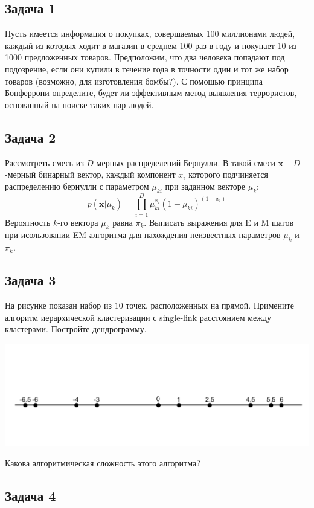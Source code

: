 \documentclass[12pt,a4paper]{article}
\author{Николай Анохин}
\begin{document}
\subsection*{Задача 1}

Пусть имеется информация о покупках, совершаемых 100 миллионами людей, каждый из которых ходит в магазин в среднем 100 раз в году и покупает 10 из 1000 предложенных товаров. Предположим, что два человека попадают под подозрение, если они купили в течение года в точности один и тот же набор товаров (возможно, для изготовления бомбы?). С помощью принципа Бонферрони определите, будет ли эффективным метод выявления террористов, основанный на поиске таких пар людей.


\subsection*{Задача 2}

Рассмотреть смесь из $D$-мерных распределений Бернулли. В такой смеси $\mathbf{x}$ -- $D$-мерный бинарный вектор, каждый компонент $x_i$ которого подчиняется распределению бернулли с параметром $\mu_{ki}$ при заданном векторе $\mu_k$:
\[
p(\mathbf{x} | \mu_k) = \prod_{i=1}^D \mu_{ki}^{x_i} (1-\mu_{ki})^{(1-x_i)}
\]
Вероятность $k$-го вектора $\mu_k$ равна $\pi_k$. Выписать выражения для E и M шагов при исользовании EM алгоритма для нахождения неизвестных параметров $\mu_k$ и $\pi_k$.

\subsection*{Задача 3}

На рисунке показан набор из $10$ точек, расположенных на прямой. Примените алгоритм иерархической кластеризации с single-link расстоянием между кластерами. Постройте дендрограмму.
\begin{center}
\includegraphics[scale=0.5]{problem_03.pdf}
\end{center}
Какова алгоритмическая сложность этого алгоритма?

\subsection*{Задача 4}
\end{document}
